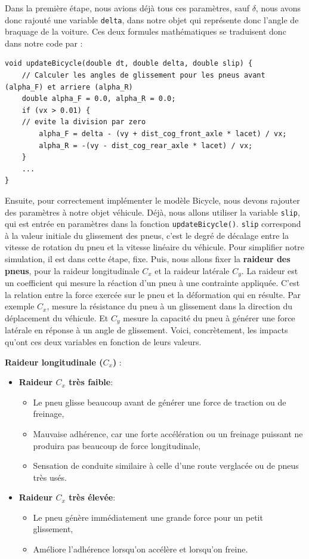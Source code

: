 Dans la première étape, nous avions déjà tous ces paramètres, sauf $\delta$, nous avons donc rajouté une variable \texttt{delta}, dans notre objet qui représente donc l'angle de braquage de la voiture. Ces deux formules mathématiques se traduisent donc dans notre code par :

\begin{lstlisting}[style=CStyle]
void updateBicycle(double dt, double delta, double slip) {
    // Calculer les angles de glissement pour les pneus avant (alpha_F) et arriere (alpha_R)
    double alpha_F = 0.0, alpha_R = 0.0;
    if (vx > 0.01) {
    // evite la division par zero
        alpha_F = delta - (vy + dist_cog_front_axle * lacet) / vx;
        alpha_R = -(vy - dist_cog_rear_axle * lacet) / vx;
    }
    ...
}
\end{lstlisting}



Ensuite, pour correctement implémenter le modèle Bicycle, nous devons rajouter des paramètres à notre objet véhicule. Déjà, nous allons utiliser la variable \texttt{slip}, qui est entrée en paramètres dans la fonction \texttt{updateBicycle()}. \texttt{slip} correspond à la valeur initiale du glissement des pneus, c'est le degré de décalage entre la vitesse de rotation du pneu et la vitesse linéaire du véhicule. Pour simplifier notre simulation, il est dans cette étape, fixe. Puis, nous allons fixer la \textbf{raideur des pneus}, pour la raideur longitudinale $C_x$ et la raideur latérale $C_y$. La raideur est un coefficient qui mesure la réaction d'un pneu à une contrainte appliquée. C'est la relation entre la force exercée sur le pneu et la déformation qui en résulte. Par exemple $C_x$, mesure la résistance du pneu à un glissement dans la direction du déplacement du véhicule. Et $C_y$ mesure la capacité du pneu à générer une force latérale en réponse à un angle de glissement. Voici, concrètement, les impacts qu'ont ces deux variables en fonction de leurs valeurs.

\textbf{Raideur longitudinale ($C_x$) }:
\begin{itemize}
    \item \textbf{Raideur $C_x$ très faible}:
    \begin{itemize}[label=$\star$]
        \item Le pneu glisse beaucoup avant de générer une force de traction ou de freinage,
        \item Mauvaise adhérence, car une forte accélération ou un freinage puissant ne produira pas beaucoup de force longitudinale,
        \item Sensation de conduite similaire à celle d’une route verglacée ou de pneus très usés.
    \end{itemize}

    \item \textbf{Raideur $C_x$ très élevée}:
    \begin{itemize}[label=$\star$]
        \item Le pneu génère immédiatement une grande force pour un petit glissement,
        \item Améliore l’adhérence lorsqu'on accélère et lorsqu'on freine.
    \end{itemize}
\end{itemize}

